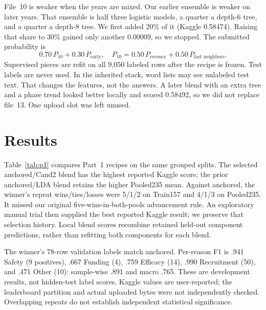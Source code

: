 \documentclass[10pt,twocolumn,letterpaper]{article}
\begin{document}
File~10 is weaker when the years are mixed. Our earlier ensemble is weaker on
later years. That ensemble is half three logistic models, a quarter a depth-6
tree, and a quarter a depth-8 tree. We first added 20\% of it (Kaggle 0.58474).
Raising that share to 30\% gained only another 0.00009, so we stopped. The
submitted probability is
\[
0.70\,P_{10} + 0.30\,P_{\text{early}},
\quad
P_{10} = 0.50\,P_{\text{recency}} + 0.50\,P_{\text{fast neighbors}}.
\]
Supervised pieces are refit on all 9,050 labeled rows after the recipe is
frozen. Test labels are never used. In the inherited stack, word lists may see
unlabeled test text. That changes the features, not the answers. A later blend
with an extra tree and a phase trend looked better locally and scored 0.58492,
so we did not replace file~13. One upload slot was left unused.

\section{Results}
\label{sec:results}

Table~\ref{tab:p1} compares Part~1 recipes on the same grouped splits. The
selected anchored/Cand2 blend has the highest reported Kaggle score; the prior
anchored/LDA blend retains the higher Pooled235 mean. Against anchored, the
winner's repeat wins/ties/losses were 5/1/2 on Train157 and 4/1/3 on Pooled235.
It missed our original five-wins-in-both-pools advancement rule. An exploratory
manual trial then supplied the best reported Kaggle result; we preserve that
selection history. Local blend scores recombine retained held-out component
predictions, rather than refitting both components for each blend.

The winner's 78-row validation labels match anchored. Per-reason F1 is .941
Safety (9 positives), .667 Funding (4), .759 Efficacy (14), .990 Recruitment
(50), and .471 Other (10): sample-wise .891 and macro .765. These are development
results, not hidden-test label scores. Kaggle values are user-reported; the
leaderboard partition and actual uploaded bytes were not independently checked.
Overlapping repeats do not establish independent statistical significance.
\end{document}
